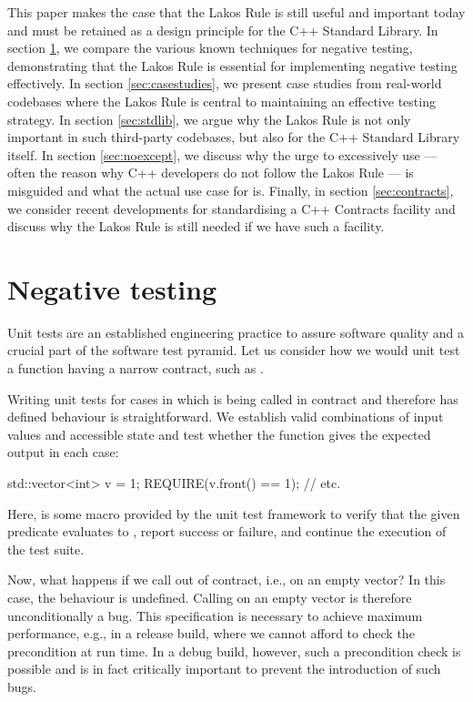 This paper makes the case that the Lakos Rule is still useful and important today and must be retained as a design principle for the C++ Standard Library. In section \ref{sec:negativetest}, we compare the various known techniques for negative testing, demonstrating that the Lakos Rule is essential for implementing negative testing effectively. In section \ref{sec:casestudies}, we present case studies from real-world codebases where the Lakos Rule is central to maintaining an effective testing strategy. In section \ref{sec:stdlib}, we argue why the Lakos Rule is not only important in such third-party codebases, but also for the C++ Standard Library itself. In section \ref{sec:noexcept}, we discuss why the urge to excessively use  --- often the reason why C++ developers do not follow the Lakos Rule --- is misguided and what the actual use case for  is. Finally, in section \ref{sec:contracts}, we consider recent developments for standardising a C++ Contracts facility and discuss why the Lakos Rule is still needed if we have such a facility.

\section{Negative testing}
\label{sec:negativetest}

Unit tests are an established engineering practice to assure software quality and a crucial part of the software test pyramid. Let us consider how we would unit test a function having a narrow contract, such as .

Writing unit tests for cases in which  is being called in contract and therefore has defined behaviour is straightforward. We establish valid combinations of input values and accessible state and test whether the function gives the expected output in each case:
\begin{codeblock}
std::vector<int> v = {1};
REQUIRE(v.front() == 1);
// etc.
\end{codeblock}
Here,  is some macro provided by the unit test framework to verify that the given predicate evaluates to , report success or failure, and continue the execution of the test suite.

Now, what happens if we call  out of contract, i.e., on an empty vector? In this case, the behaviour is undefined. Calling  on an empty vector is therefore unconditionally a bug. This specification is necessary to achieve maximum performance, e.g., in a release build, where we cannot afford to check the precondition at run time. In a debug build, however, such a precondition check is possible and is in fact critically important to prevent the introduction of such bugs.

